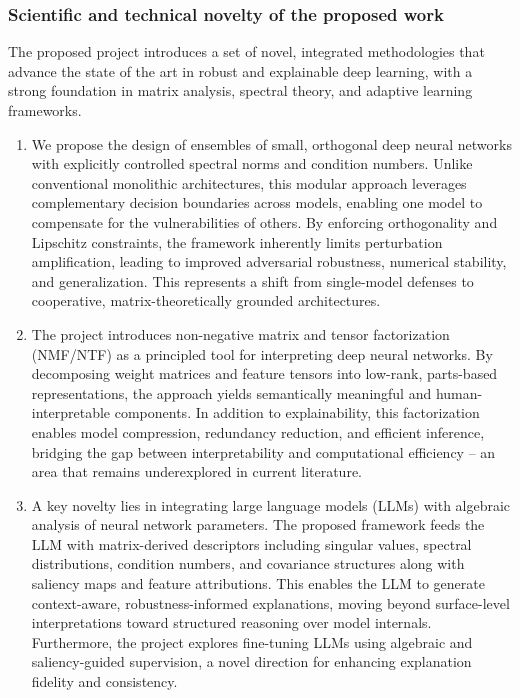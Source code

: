 \documentclass[a4paper,11pt]{article}
\begin{document}
\subsubsection{Scientific and technical novelty of the proposed work}
The proposed project introduces a set of novel, integrated methodologies that advance the state of the art in robust and explainable deep learning, with a strong foundation in matrix analysis, spectral theory, and adaptive learning frameworks.
\begin{enumerate}
	\item We propose the design of ensembles of small, orthogonal deep neural networks with explicitly controlled spectral norms and condition numbers. Unlike conventional monolithic architectures, this modular approach leverages complementary decision boundaries across models, enabling one model to compensate for the vulnerabilities of others. By enforcing orthogonality and Lipschitz constraints, the framework inherently limits perturbation amplification, leading to improved adversarial robustness, numerical stability, and generalization. This represents a shift from single-model defenses to cooperative, matrix-theoretically grounded architectures.
	
	\item The project introduces non-negative matrix and tensor factorization (NMF/NTF) as a principled tool for interpreting deep neural networks. By decomposing weight matrices and feature tensors into low-rank, parts-based representations, the approach yields semantically meaningful and human-interpretable components. In addition to explainability, this factorization enables model compression, redundancy reduction, and efficient inference, bridging the gap between interpretability and computational efficiency -- an area that remains underexplored in current literature.
	
	\item A key novelty lies in integrating large language models (LLMs) with algebraic analysis of neural network parameters. The proposed framework feeds the LLM with matrix-derived descriptors including singular values, spectral distributions, condition numbers, and covariance structures along with saliency maps and feature attributions. This enables the LLM to generate context-aware, robustness-informed explanations, moving beyond surface-level interpretations toward structured reasoning over model internals. Furthermore, the project explores fine-tuning LLMs using algebraic and saliency-guided supervision, a novel direction for enhancing explanation fidelity and consistency.
	

\end{enumerate}
\end{document}
